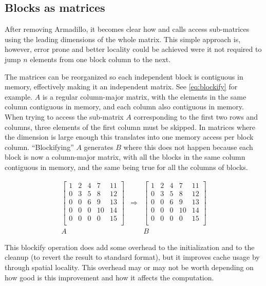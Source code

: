 \documentclass[../thesis]{subfiles}
\begin{document}
	\subsection{Blocks as matrices}
	\label{subsec:mic:optims:blockified}

	After removing Armadillo, it becomes clear how \blas and \lapack calls access sub-matrices using the leading dimensions of the whole matrix. This simple approach is, however, error prone and better locality could be achieved were it not required to jump $n$ elements from one block column to the next.

	The matrices can be reorganized so each independent block is contiguous in memory, effectively making it an independent matrix. See \cref{eq:blockify} for example. $A$ is a regular column-major matrix, with the elements in the same column contiguous in memory, and each column also contiguous in memory. When trying to access the sub-matrix $A$ corresponding to the first two rows and columns, three elements of the first column must be skipped. In matrices where the dimension is large enough this translates into one memory access per block column. ``Blockifying'' $A$ generates $B$ where this does not happen because each block is now a column-major matrix, with all the blocks in the same column contiguous in memory, and the same being true for all the columns of blocks.

	\begin{equation}
		\begin{array}{ccc}
			\left[
			\begin{array}{c|c|c|c|c}
				 1 &  2 &  4 &  7 & 11  \\
				 0 &  3 &  5 &  8 & 12  \\
				 0 &  0 &  6 &  9 & 13  \\
				 0 &  0 &  0 & 10 & 14  \\
				 0 &  0 &  0 &  0 & 15  \\
			\end{array}
			\right] & \Rightarrow & \left[
			\begin{array}{cc|cc|c}
				 1 &  2 &  4 &  7 & 11  \\
				 0 &  3 &  5 &  8 & 12  \\
				 \hline
				 0 &  0 &  6 &  9 & 13  \\
				 0 &  0 &  0 & 10 & 14  \\
				 \hline
				 0 &  0 &  0 &  0 & 15  \\
			\end{array}
			\right] \\
			A & & B
		\end{array}
		\label{eq:blockify}
	\end{equation}

	This blockify operation does add some overhead to the initialization and to the cleanup (to revert the result to standard format), but it improves cache usage by through spatial locality. This overhead may or may not be worth depending on how good is this improvement and how it affects the computation.
\end{document}
